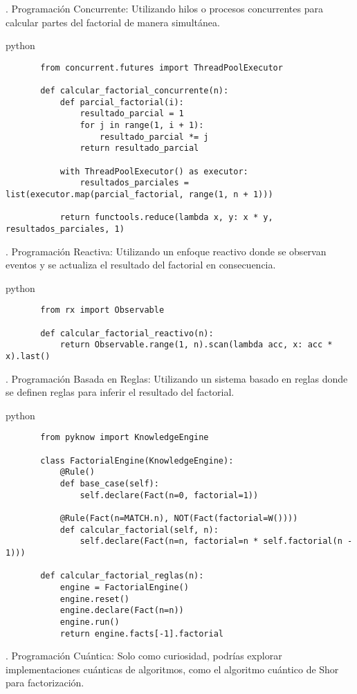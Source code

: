 . Programación Concurrente:
   Utilizando hilos o procesos concurrentes para calcular partes del factorial de manera simultánea.

   python
   \begin{verbatim}
       from concurrent.futures import ThreadPoolExecutor
    
       def calcular_factorial_concurrente(n):
           def parcial_factorial(i):
               resultado_parcial = 1
               for j in range(1, i + 1):
                   resultado_parcial *= j
               return resultado_parcial
    
           with ThreadPoolExecutor() as executor:
               resultados_parciales = list(executor.map(parcial_factorial, range(1, n + 1)))
    
           return functools.reduce(lambda x, y: x * y, resultados_parciales, 1)
   \end{verbatim}

. Programación Reactiva:
   Utilizando un enfoque reactivo donde se observan eventos y se actualiza el resultado del factorial en consecuencia.

   python
   \begin{verbatim}
       from rx import Observable
    
       def calcular_factorial_reactivo(n):
           return Observable.range(1, n).scan(lambda acc, x: acc * x).last()
   \end{verbatim}

. Programación Basada en Reglas:
   Utilizando un sistema basado en reglas donde se definen reglas para inferir el resultado del factorial.

   python
   \begin{verbatim}
       from pyknow import KnowledgeEngine
    
       class FactorialEngine(KnowledgeEngine):
           @Rule()
           def base_case(self):
               self.declare(Fact(n=0, factorial=1))
    
           @Rule(Fact(n=MATCH.n), NOT(Fact(factorial=W())))
           def calcular_factorial(self, n):
               self.declare(Fact(n=n, factorial=n * self.factorial(n - 1)))
    
       def calcular_factorial_reglas(n):
           engine = FactorialEngine()
           engine.reset()
           engine.declare(Fact(n=n))
           engine.run()
           return engine.facts[-1].factorial
   \end{verbatim}

. Programación Cuántica:
   Solo como curiosidad, podrías explorar implementaciones cuánticas de algoritmos, como el algoritmo cuántico de Shor para factorización.

